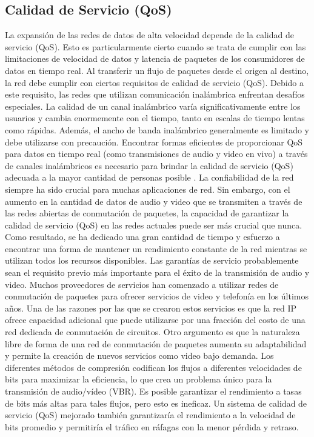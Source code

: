\subsection{Calidad de Servicio (QoS)}
La expansión de las redes de datos de alta velocidad depende de la calidad de servicio (QoS). Esto es particularmente cierto cuando se trata de cumplir con las limitaciones de velocidad de datos y latencia de paquetes de los consumidores de datos en tiempo real. Al transferir un flujo de paquetes desde el origen al destino, la red debe cumplir con ciertos requisitos de calidad de servicio (QoS). Debido a este requisito, las redes que utilizan comunicación inalámbrica enfrentan desafíos especiales. La calidad de un canal inalámbrico varía significativamente entre los usuarios y cambia enormemente con el tiempo, tanto en escalas de tiempo lentas como rápidas. Además, el ancho de banda inalámbrico generalmente es limitado y debe utilizarse con precaución. Encontrar formas eficientes de proporcionar QoS para datos en tiempo real (como transmisiones de audio y video en vivo) a través de canales inalámbricos es necesario para brindar la calidad de servicio (QoS) adecuada a la mayor cantidad de personas posible \parencite{tec_pang2010wifireport}. La confiabilidad de la red siempre ha sido crucial para muchas aplicaciones de red. Sin embargo, con el aumento en la cantidad de datos de audio y video que se transmiten a través de las redes abiertas de conmutación de paquetes, la capacidad de garantizar la calidad de servicio (QoS) en las redes actuales puede ser más crucial que nunca. Como resultado, se ha dedicado una gran cantidad de tiempo y esfuerzo a encontrar una forma de mantener un rendimiento constante de la red mientras se utilizan todos los recursos disponibles. Las garantías de servicio probablemente sean el requisito previo más importante para el éxito de la transmisión de audio y video. Muchos proveedores de servicios han comenzado a utilizar redes de conmutación de paquetes para ofrecer servicios de video y telefonía en los últimos años. Una de las razones por las que se crearon estos servicios es que la red IP ofrece capacidad adicional que puede utilizarse por una fracción del costo de una red dedicada de conmutación de circuitos. Otro argumento es que la naturaleza libre de forma de una red de conmutación de paquetes aumenta su adaptabilidad y permite la creación de nuevos servicios como video bajo demanda. Los diferentes métodos de compresión codifican los flujos a diferentes velocidades de bits para maximizar la eficiencia, lo que crea un problema único para la transmisión de audio/vídeo (VBR). Es posible garantizar el rendimiento a tasas de bits más altas para tales flujos, pero esto es ineficaz. Un sistema de calidad de servicio (QoS) mejorado también garantizaría el rendimiento a la velocidad de bits promedio y permitiría el tráfico en ráfagas con la menor pérdida y retraso. \parencite{tec_pang2010wifireport}

